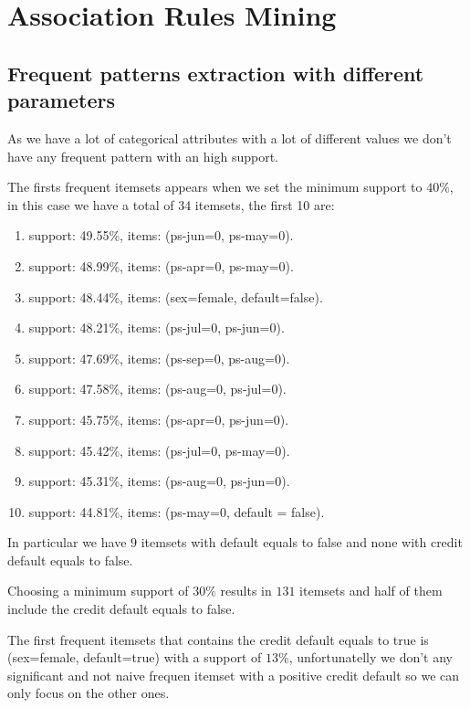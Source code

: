 \chapter{Association Rules Mining}

\section{Frequent patterns extraction with different parameters}

As we have a lot of categorical attributes with a lot of different values we don't have any frequent pattern with an high support. 

The firsts frequent itemsets appears when we set the minimum support to $40\%$, in this case we have a total of 34 itemsets, the first 10 are:

\begin{enumerate}
  \item support: 49.55\%, items: (ps-jun=0, ps-may=0).
  \item support: 48.99\%, items: (ps-apr=0, ps-may=0).
  \item support: 48.44\%, items: (sex=female, default=false).
  \item support: 48.21\%, items: (ps-jul=0, ps-jun=0).
  \item support: 47.69\%, items: (ps-sep=0, ps-aug=0).
  \item support: 47.58\%, items: (ps-aug=0, ps-jul=0).
  \item support: 45.75\%, items: (ps-apr=0, ps-jun=0).
  \item support: 45.42\%, items: (ps-jul=0, ps-may=0).
  \item support: 45.31\%, items: (ps-aug=0, ps-jun=0).
  \item support: 44.81\%, items: (ps-may=0, default = false).
\end{enumerate}

In particular we have $9$ itemsets with default equals to false and none with credit default equals to false.

\smallskip

Choosing a minimum support of $30\%$ results in $131$ itemsets and half of them include the credit default equals to false.

\smallskip

The first frequent itemsets that contains the credit default equals to true is (sex=female, default=true) with a support of $13\%$, unfortunatelly we don't any significant and not naive frequen itemset with a positive credit default so we can only focus on the other ones.

